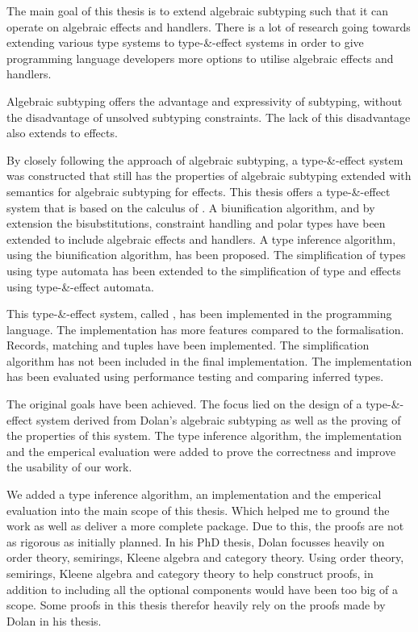 The main goal of this thesis is to extend algebraic subtyping such that it can operate on algebraic effects and handlers. There is a lot of research going towards extending various type systems to type-\&-effect systems in order to give programming language developers more options to utilise algebraic effects and handlers. 

Algebraic subtyping offers the advantage and expressivity of subtyping, without the disadvantage of unsolved subtyping constraints. The lack of this disadvantage also extends to effects.

By closely following the approach of algebraic subtyping, a type-\&-effect system was constructed that still has the properties of algebraic subtyping extended with semantics for algebraic subtyping for effects. This thesis offers a type-\&-effect system that is based on the calculus of \eff. A biunification algorithm, and by extension the bisubstitutions, constraint handling and polar types have been extended to include algebraic effects and handlers. A type inference algorithm, using the biunification algorithm, has been proposed. The simplification of types using type automata has been extended to the simplification of type and effects using type-\&-effect automata.

This type-\&-effect system, called \core, has been implemented in the \eff programming language. The implementation has more features compared to the formalisation. Records, matching and tuples have been implemented. The simplification algorithm has not been included in the final implementation. The implementation has been evaluated using performance testing and comparing inferred types.

The original goals have been achieved. The focus lied on the design of a type-\&-effect system derived from Dolan's algebraic subtyping as well as the proving of the properties of this system. The type inference algorithm, the implementation and the emperical evaluation were added to prove the correctness and improve the usability of our work. 

We added a type inference algorithm, an implementation and the emperical evaluation into the main scope of this thesis. Which helped me to ground the work as well as deliver a more complete package. Due to this, the proofs are not as rigorous as initially planned. In his PhD thesis, Dolan focusses heavily on order theory, semirings, Kleene algebra and category theory. Using order theory, semirings, Kleene algebra and category theory to help construct proofs, in addition to including all the optional components would have been too big of a scope. Some proofs in this thesis therefor heavily rely on the proofs made by Dolan in his thesis.

